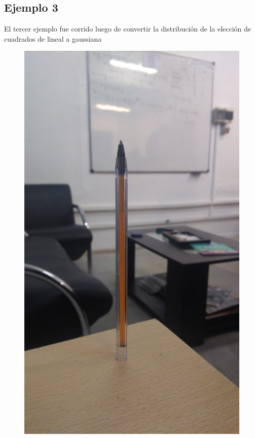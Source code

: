 \documentclass[conference]{IEEEtran}
\begin{document}
\subsection{Ejemplo 3}
El tercer ejemplo fue corrido luego de convertir la distribución de la elección de cuadrados de lineal a gaussiana
\begin{figure}[H]
\begin{centering}
\includegraphics[scale=0.18]{imagen3.jpeg}

\end{centering}
\end{figure}
\end{document}
